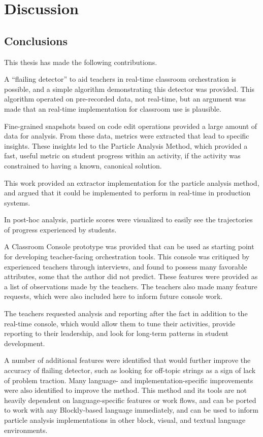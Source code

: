 \chapter{Discussion}
\label{ch:discussion}





\section{Conclusions}
\label{sec:conclusions}
This thesis has made the following contributions.

A ``flailing detector'' to aid teachers in real-time classroom orchestration is possible, and a simple algorithm demonstrating this detector was provided. This algorithm operated on pre-recorded data, not real-time, but an argument was made that an real-time implementation for classroom use is plausible. 

Fine-grained snapshots based on code edit operations provided a large amount of data for analysis. From these data, metrics were extracted that lead to specific insights. These insights led to the Particle Analysis Method, which provided a fast, useful metric on student progress within an activity, if the activity was constrained to having a known, canonical solution.

This work provided an extractor implementation for the particle analysis method, and argued that it could be implemented to perform in real-time in production systems.

In post-hoc analysis, particle scores were visualized to easily see the trajectories of progress experienced by students. 

A Classroom Console prototype was provided that can be used as starting point for developing teacher-facing orchestration tools. This console was critiqued by experienced teachers through interviews, and found to possess many favorable attributes, some that the author did not predict. These features were provided as a list of observations made by the teachers. The teachers also made many feature requests, which were also included here to inform future console work. 

The teachers requested analysis and reporting after the fact in addition to the real-time console, which would allow them to tune their activities, provide reporting to their leadership, and look for long-term patterns in student development. 

A number of additional features were identified that would further improve the accuracy of flailing detector, such as looking for off-topic strings as a sign of lack of problem traction. Many language- and implementation-specific improvements were also identified to improve the method. This method and its tools are not heavily dependent on language-specific features or work flows, and can be ported to work with any Blockly-based language immediately, and can be used to inform particle analysis implementations in other block, visual, and textual language environments.

